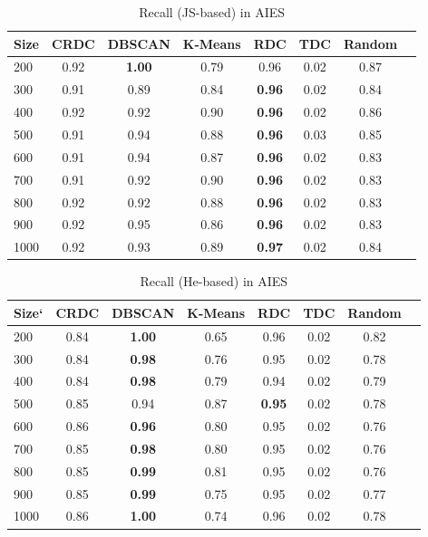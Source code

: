 \begin{table}[!htb]
    \centering
        \begin{tabular}{l*{6}{c}r}\hline
                    Size  & CRDC & DBSCAN & K-Means & RDC & TDC  & Random \\
          \hline
					200  & 0.92  & \textbf{1.00}  & 0.79  & 0.96  & 0.02  & 0.87 \\
					300  & 0.91  & 0.89  & 0.84  & \textbf{0.96}  & 0.02  & 0.84 \\
					400  & 0.92  & 0.92  & 0.90  & \textbf{0.96}  & 0.02  & 0.86 \\
					500  & 0.91  & 0.94  & 0.88  & \textbf{0.96}  & 0.03  & 0.85 \\
					600  & 0.91  & 0.94  & 0.87  & \textbf{0.96}  & 0.02  & 0.83 \\
					700  & 0.91  & 0.92  & 0.90  & \textbf{0.96}  & 0.02  & 0.83 \\
					800  & 0.92  & 0.92  & 0.88  & \textbf{0.96}  & 0.02  & 0.83 \\
					900  & 0.92  & 0.95  & 0.86  & \textbf{0.96}  & 0.02  & 0.83 \\
					1000  & 0.92  & 0.93  & 0.89  & \textbf{0.97}  & 0.02  & 0.84 \\
        \end{tabular}
    \caption{Recall (JS-based) in AIES}\label{tab:recallHe}
\end{table}

\begin{table}[!htb]
    \centering
        \begin{tabular}{l*{6}{c}r}\hline
                    Size`  & CRDC & DBSCAN & K-Means & RDC & TDC  & Random \\
          \hline
					200 & 0.84 & \textbf{1.00} & 0.65 & 0.96 & 0.02 & 0.82 \\
					300 & 0.84 & \textbf{0.98} & 0.76 & 0.95 & 0.02 & 0.78 \\
					400 & 0.84 & \textbf{0.98} & 0.79 & 0.94 & 0.02 & 0.79 \\
					500 & 0.85 & 0.94 & 0.87 & \textbf{0.95} & 0.02 & 0.78 \\
					600 & 0.86 & \textbf{0.96} & 0.80 & 0.95 & 0.02 & 0.76 \\
					700 & 0.85 & \textbf{0.98} & 0.80 & 0.95 & 0.02 & 0.76 \\
					800 & 0.85 & \textbf{0.99} & 0.81 & 0.95 & 0.02 & 0.76 \\
					900 & 0.85 & \textbf{0.99} & 0.75 & 0.95 & 0.02 & 0.77 \\
					1000 & 0.86 & \textbf{1.00} & 0.74 & 0.96 & 0.02 & 0.78 \\
        \end{tabular}
    \caption{Recall (He-based) in AIES}\label{tab:recallJS}
\end{table}



